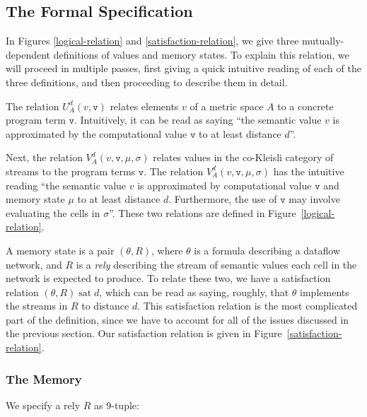 \documentclass[preprint]{sigplanconf}
\newcommand{\term}[1]{\ensuremath{\mathtt{{#1}}}}
\newcommand{\satisfy}[2]{{#1}\;\mathrm{sat}\;{#2}}
\begin{document}
\subsection{The Formal Specification}

In Figures \ref{logical-relation} and \ref{satisfaction-relation}, we
give three mutually-dependent definitions of values and memory
states. To explain this relation, we will proceed in multiple passes,
first giving a quick intuitive reading of each of the three
definitions, and then proceeding to describe them in detail.

The relation $U^d_A(v, \term{v})$ relates elements $v$ of a metric
space $A$ to a concrete program term \term{v}. Intuitively, it can be
read as saying ``the semantic value $v$ is approximated by the
computational value \term{v} to at least distance $d$''. 

Next, the relation $V^d_A(v, \term{v}, \mu, \sigma)$ relates values in
the co-Kleisli category of streams to the program terms \term{v}. The
relation $V^d_A(v, \term{v}, \mu, \sigma)$ has the intuitive reading
``the semantic value $v$ is approximated by computational value
\term{v} and memory state $\mu$ to at least distance $d$. Furthermore,
the use of \term{v} may involve evaluating the cells in
$\sigma$''. These two relations are defined in
Figure~\ref{logical-relation}.

A memory state is a pair $(\theta, R)$, where $\theta$ is a formula
describing a dataflow network, and $R$ is a \emph{rely} describing the
stream of semantic values each cell in the network is expected to
produce. To relate these two, we have a satisfaction relation
$\satisfy{(\theta, R)}{d}$, which can be read as saying, roughly, that
$\theta$ implements the streams in $R$ to distance $d$. This
satisfaction relation is the most complicated part of the definition,
since we have to account for all of the issues discussed in the
previous section. Our satisfaction relation is given in
Figure~\ref{satisfaction-relation}.


\subsubsection{The Memory}

We specify a rely $R$ as 9-tuple:
\end{document}
